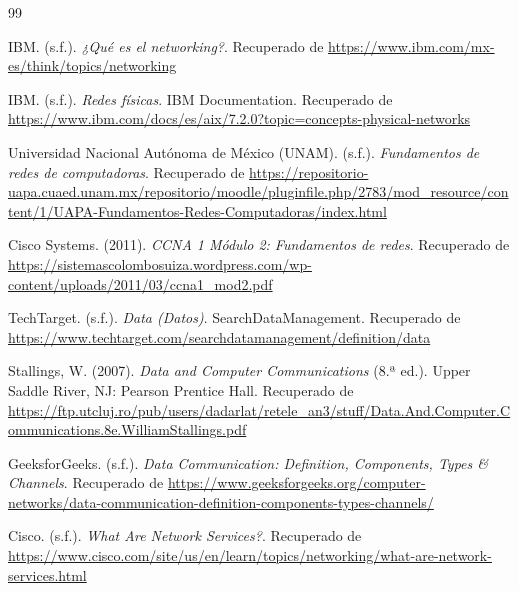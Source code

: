 \documentclass[a4paper,12pt]{article}
\begin{document}
\begin{thebibliography}{99}

IBM. (s.f.). \textit{¿Qué es el networking?}. Recuperado de \url{https://www.ibm.com/mx-es/think/topics/networking}

IBM. (s.f.). \textit{Redes físicas}. IBM Documentation. Recuperado de \url{https://www.ibm.com/docs/es/aix/7.2.0?topic=concepts-physical-networks}

Universidad Nacional Autónoma de México (UNAM). (s.f.). \textit{Fundamentos de redes de computadoras}. Recuperado de \url{https://repositorio-uapa.cuaed.unam.mx/repositorio/moodle/pluginfile.php/2783/mod_resource/content/1/UAPA-Fundamentos-Redes-Computadoras/index.html}

Cisco Systems. (2011). \textit{CCNA 1 Módulo 2: Fundamentos de redes}. Recuperado de \url{https://sistemascolombosuiza.wordpress.com/wp-content/uploads/2011/03/ccna1_mod2.pdf}

TechTarget. (s.f.). \textit{Data (Datos)}. SearchDataManagement. Recuperado de \url{https://www.techtarget.com/searchdatamanagement/definition/data}

Stallings, W. (2007). \textit{Data and Computer Communications} (8.ª ed.). Upper Saddle River, NJ: Pearson Prentice Hall. Recuperado de \url{https://ftp.utcluj.ro/pub/users/dadarlat/retele_an3/stuff/Data.And.Computer.Communications.8e.WilliamStallings.pdf}

GeeksforGeeks. (s.f.). \textit{Data Communication: Definition, Components, Types \& Channels}. Recuperado de \url{https://www.geeksforgeeks.org/computer-networks/data-communication-definition-components-types-channels/}

Cisco. (s.f.). \textit{What Are Network Services?}. Recuperado de \url{https://www.cisco.com/site/us/en/learn/topics/networking/what-are-network-services.html}

\end{thebibliography}
\end{document}

